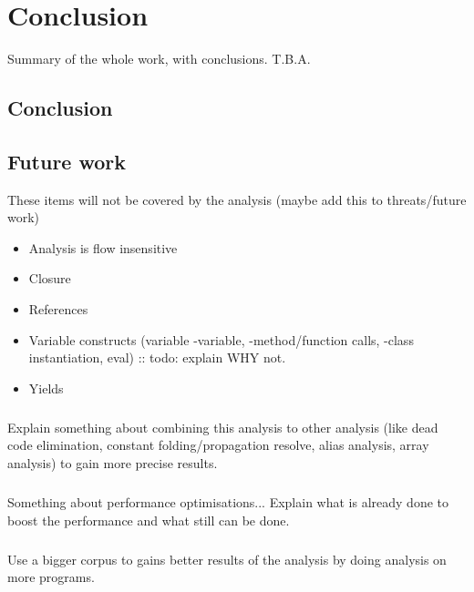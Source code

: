\documentclass[main.tex]{subfiles}
\begin{document}
    \chapter{Conclusion}\label{ch:conclusion}
    Summary of the whole work, with conclusions. T.B.A.
    
    \section{Conclusion}
    
    \section{Future work}
    These items will not be covered by the analysis (maybe add this to threats/future work)
    \begin{itemize}
        \item Analysis is flow insensitive
        \item Closure
        \item References
        \item Variable constructs (variable -variable, -method/function calls, -class instantiation, eval) :: todo: explain WHY not.
        \item Yields
    \end{itemize}

    
    \paragraph{}
    Explain something about combining this analysis to other analysis (like dead code elimination, constant folding/propagation resolve, alias analysis, array analysis) to gain more precise results.
    
    \paragraph{}
    Something about performance optimisations... Explain what is already done to boost the performance and what still can be done.
        
    \paragraph{}
    Use a bigger corpus to gains better results of the analysis by doing analysis on more programs.
    
\end{document}
